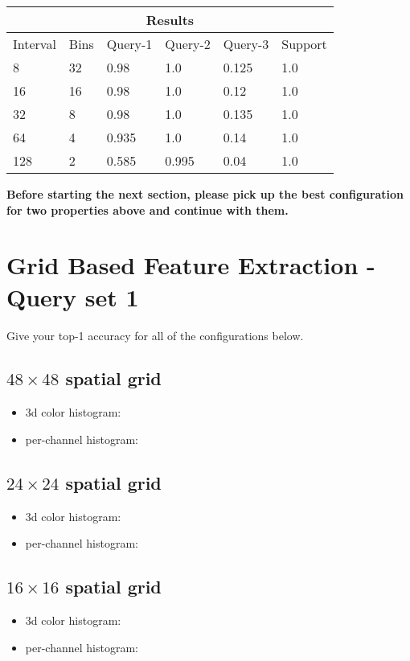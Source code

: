 \documentclass[12pt]{article}
\begin{document}
\begin{tabular}{ |p{1.5cm}|p{1.5cm}||p{2cm}|p{2cm}|p{2cm}|p{2cm}|  }
    \hline
    \multicolumn{6}{|c|}{Results} \\
    \hline
    Interval & Bins & Query-1 & Query-2 & Query-3 & Support \\
    \hline
    8 & 32 & 0.98 & 1.0 & 0.125 & 1.0 \\
    \hline
    16 & 16 & 0.98 & 1.0 & 0.12 & 1.0 \\
    \hline
    32 & 8 & 0.98 & 1.0 & 0.135 & 1.0 \\
    \hline
    64 & 4 & 0.935 & 1.0 & 0.14 & 1.0 \\
    \hline
    128 & 2 & 0.585 & 0.995 & 0.04 & 1.0 \\
    \hline
\end{tabular}

\vspace{1cm}


\newpage
\textbf{Before starting the next section, please pick up the best configuration for two properties above and continue with them.}

\section{Grid Based Feature Extraction - Query set 1}
Give your top-1 accuracy for all of the configurations below.

\subsection{$48\times48$ spatial grid}
\begin{itemize}
\item 3d color histogram:
\item per-channel histogram:
\end{itemize}

\subsection{$24\times24$ spatial grid}
\begin{itemize}
\item 3d color histogram:
\item per-channel histogram:
\end{itemize}

\subsection{$16\times16$ spatial grid}
\begin{itemize}
\item 3d color histogram:
\item per-channel histogram:
\end{itemize}
\end{document}
